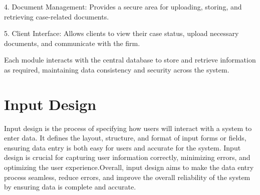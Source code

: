 4. Document Management: Provides a secure area for uploading, storing, and retrieving case-related documents.

5. Client Interface: Allows clients to view their case status, upload necessary documents, and communicate with the firm.


Each module interacts with the central database to store and retrieve information as required, maintaining data consistency and security across the system.

\section{Input Design}
Input design is the process of specifying how users will interact with a system to enter data. It defines the layout, structure, and format of input forms or fields, ensuring data entry is both easy for users and accurate for the system. Input design is crucial for capturing user information correctly, minimizing errors, and optimizing the user experience.Overall, input design aims to make the data entry process seamless, reduce errors, and improve the overall reliability of the system by ensuring data is complete and accurate.


